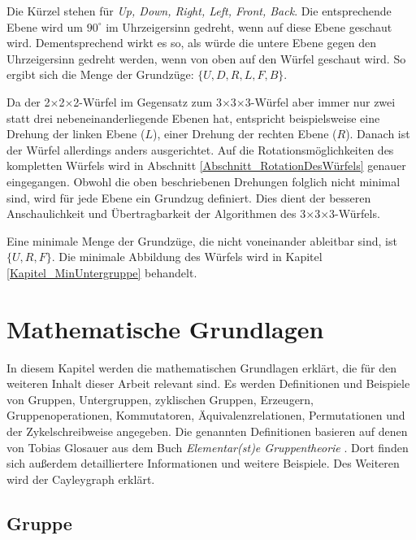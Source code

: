 \documentclass[12pt,a4paper, usenames, dvipsnames]{article}
\theoremstyle{mystyle}
\theoremstyle{definition}
\newcommand{\Ttwo}{2$\times$2$\times$2-}
\newcommand{\Tthree}{3$\times$3$\times$3-}
\begin{document}
Die Kürzel stehen für \textit{Up, Down, Right, Left, Front, Back}. 
Die entsprechende Ebene wird um $90^\circ$ im Uhrzeigersinn gedreht, wenn auf diese Ebene geschaut wird. Dementsprechend wirkt es so, als würde die untere Ebene gegen den Uhrzeigersinn gedreht werden, wenn von oben auf den Würfel geschaut wird. So ergibt sich die Menge der Grundzüge: $\{U, D, R, L, F, B\}$.


Da der \Ttwo Würfel im Gegensatz zum \Tthree Würfel aber immer nur zwei statt drei nebeneinanderliegende Ebenen hat, entspricht beispielsweise eine Drehung der linken Ebene ($L$), einer Drehung der rechten Ebene ($R$). Danach ist der Würfel allerdings anders ausgerichtet. 
Auf die Rotationsmöglichkeiten des kompletten Würfels wird in Abschnitt \ref{Abschnitt_RotationDesWürfels} genauer eingegangen. 
Obwohl die oben beschriebenen Drehungen folglich nicht minimal sind, wird für jede Ebene ein Grundzug definiert. Dies dient der besseren Anschaulichkeit und Übertragbarkeit der Algorithmen des \Tthree Würfels.


Eine minimale Menge der Grundzüge, die nicht voneinander ableitbar sind, ist $\{U, R, F\}$. Die minimale Abbildung des Würfels wird in Kapitel \ref{Kapitel_MinUntergruppe} behandelt.



%
%
%
%
%
%
%
%
%
%
%
%
%
%
%
%
%


\newpage
\section{Mathematische Grundlagen}

\label{Kapitel_MathematischeGrundlagen}

In diesem Kapitel werden die mathematischen Grundlagen erklärt, die für den weiteren Inhalt dieser Arbeit relevant sind. Es werden Definitionen und Beispiele von Gruppen, Untergruppen, zyklischen Gruppen, Erzeugern, Gruppenoperationen, Kommutatoren, Äquivalenzrelationen, Permutationen und der Zykelschreibweise angegeben.
Die genannten Definitionen basieren auf denen von Tobias Glosauer aus dem Buch \textit{Elementar(st)e Gruppentheorie} \cite{Buch}. Dort finden sich außerdem detailliertere Informationen und weitere Beispiele.
Des Weiteren wird der Cayleygraph erklärt. 
%
%
%
%
%
%
\subsection{Gruppe}
\label{Abschnitt_Gruppe}
\end{document}
